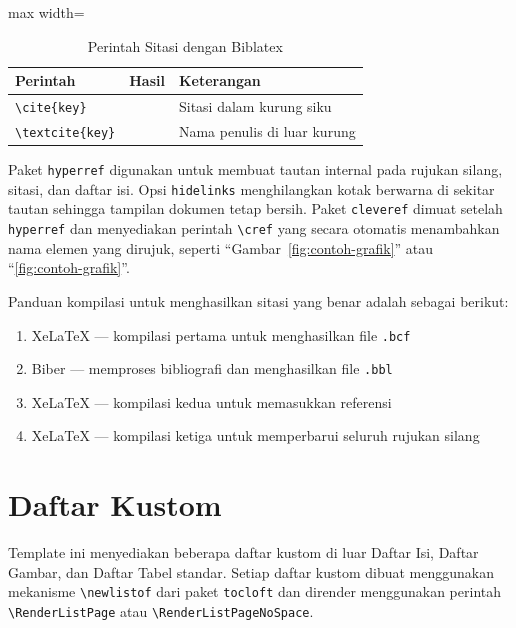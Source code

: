 \begin{table}[h]
  \centering
  \caption{Perintah Sitasi dengan Biblatex}
  \label{tab:sitasi-perintah}
  \begin{adjustbox}{max width=\textwidth}
  \begin{tabular}{llp{5cm}}
    \toprule
    \textbf{Perintah} & \textbf{Hasil} & \textbf{Keterangan} \\
    \midrule
    \texttt{\textbackslash cite\{key\}} & \cite{Zhou2025} & Sitasi dalam kurung siku \\
    \texttt{\textbackslash textcite\{key\}} & \textcite{Zhou2025} & Nama penulis di luar kurung \\
    \bottomrule
  \end{tabular}
  \end{adjustbox}
\end{table}

Paket \texttt{hyperref} digunakan untuk membuat tautan internal pada rujukan silang, sitasi, dan daftar isi. Opsi \texttt{hidelinks} menghilangkan kotak berwarna di sekitar tautan sehingga tampilan dokumen tetap bersih. Paket \texttt{cleveref} dimuat setelah \texttt{hyperref} dan menyediakan perintah \texttt{\textbackslash cref} yang secara otomatis menambahkan nama elemen yang dirujuk, seperti ``Gambar~\ref{fig:contoh-grafik}'' atau ``\cref{fig:contoh-grafik}''.

Panduan kompilasi untuk menghasilkan sitasi yang benar adalah sebagai berikut:
\begin{enumerate}
  \item XeLaTeX --- kompilasi pertama untuk menghasilkan file \texttt{.bcf}
  \item Biber --- memproses bibliografi dan menghasilkan file \texttt{.bbl}
  \item XeLaTeX --- kompilasi kedua untuk memasukkan referensi
  \item XeLaTeX --- kompilasi ketiga untuk memperbarui seluruh rujukan silang
\end{enumerate}

\section{Daftar Kustom}

Template ini menyediakan beberapa daftar kustom di luar Daftar Isi, Daftar Gambar, dan Daftar Tabel standar. Setiap daftar kustom dibuat menggunakan mekanisme \texttt{\textbackslash newlistof} dari paket \texttt{tocloft} dan dirender menggunakan perintah \texttt{\textbackslash RenderListPage} atau \texttt{\textbackslash RenderListPageNoSpace}.

